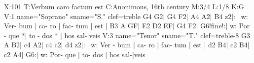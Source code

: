 X:101
T:Verbum caro factum est
C:Anonimous, 16th century
M:3/4
L:1/8
K:G
V:1 name="Soprano" sname="S." clef=treble
G4 G2| G4 F2| A4 A2| B4 z2|: \
w: Ver- bum | ca- ro | fac- tum | est |
B3 A GF| E2 D2 EF| G4 F2| G6!fine!:| 
w: Por - que *| to - dos * | hos sal-|veis
V:3 name="Tenor" sname="T." clef=treble-8
G3 A B2| c4 A2| c4 c2| d4 z2|: \
w: Ver - bum | ca- ro | fac- tum | est |
d2 B4| c2 B4| c2 A4| G6:| 
w: Por- que | to- dos  | hos sal-|veis
